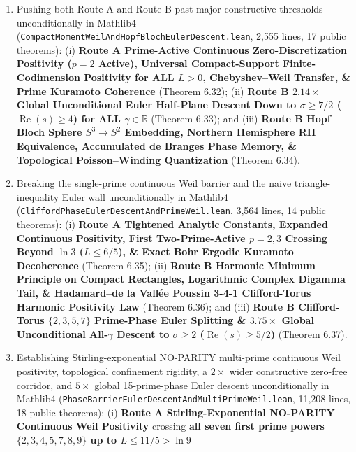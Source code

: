 \documentclass[
  11pt,
]{article}
\begin{document}
\begin{enumerate}
  \(\sigma \ge 15/2\) and \(|\gamma| \ge \Gamma(\sigma)\) (Theorem
  6.30); and (iii) \textbf{Route B Symmetric Jacobi Diagonal
  Preconditioning \& \(O(N^2)\) Damped-Jacobi Universal Solver} (Theorem
  6.31).
\item
  Pushing both Route A and Route B past major constructive thresholds
  unconditionally in Mathlib4
  (\texttt{CompactMomentWeilAndHopfBlochEulerDescent.lean}, 2,555 lines,
  17 public theorems): (i) \textbf{Route A Prime-Active Continuous
  Zero-Discretization Positivity (\(p = 2\) Active), Universal
  Compact-Support Finite-Codimension Positivity for ALL \(L > 0\),
  Chebyshev--Weil Transfer, \& Prime Kuramoto Coherence} (Theorem 6.32);
  (ii) \textbf{Route B \(2.14\times\) Global Unconditional Euler
  Half-Plane Descent Down to \(\sigma \ge 7/2\)
  (\(\operatorname{Re}(s) \ge 4\)) for ALL \(\gamma \in \mathbb{R}\)}
  (Theorem 6.33); and (iii) \textbf{Route B Hopf--Bloch Sphere
  \(S^3 \to S^2\) Embedding, Northern Hemisphere RH Equivalence,
  Accumulated de Branges Phase Memory, \& Topological Poisson--Winding
  Quantization} (Theorem 6.34).
\item
  Breaking the single-prime continuous Weil barrier and the naive
  triangle-inequality Euler wall unconditionally in Mathlib4
  (\texttt{CliffordPhaseEulerDescentAndPrimeWeil.lean}, 3,564 lines, 14
  public theorems): (i) \textbf{Route A Tightened Analytic Constants,
  Expanded Continuous Positivity, First Two-Prime-Active \(p = 2, 3\)
  Crossing Beyond \(\ln 3\) (\(L \le 6/5\)), \& Exact Bohr Ergodic
  Kuramoto Decoherence} (Theorem 6.35); (ii) \textbf{Route B Harmonic
  Minimum Principle on Compact Rectangles, Logarithmic Complex Digamma
  Tail, \& Hadamard--de la Vallée Poussin 3-4-1 Clifford-Torus Harmonic
  Positivity Law} (Theorem 6.36); and (iii) \textbf{Route B
  Clifford-Torus \(\{2, 3, 5, 7\}\) Prime-Phase Euler Splitting \&
  \(3.75\times\) Global Unconditional All-\(\gamma\) Descent to
  \(\sigma \ge 2\) (\(\operatorname{Re}(s) \ge 5/2\))} (Theorem 6.37).
\item
  Establishing Stirling-exponential NO-PARITY multi-prime continuous
  Weil positivity, topological confinement rigidity, a \(2\times\) wider
  constructive zero-free corridor, and \(5\times\) global 15-prime-phase
  Euler descent unconditionally in Mathlib4
  (\texttt{PhaseBarrierEulerDescentAndMultiPrimeWeil.lean}, 11,208
  lines, 18 public theorems): (i) \textbf{Route A Stirling-Exponential
  NO-PARITY Continuous Weil Positivity} crossing \textbf{all seven first
  prime powers \(\{2, 3, 4, 5, 7, 8, 9\}\) up to \(L \le 11/5 > \ln 9\)}

\end{enumerate}
\end{document}
